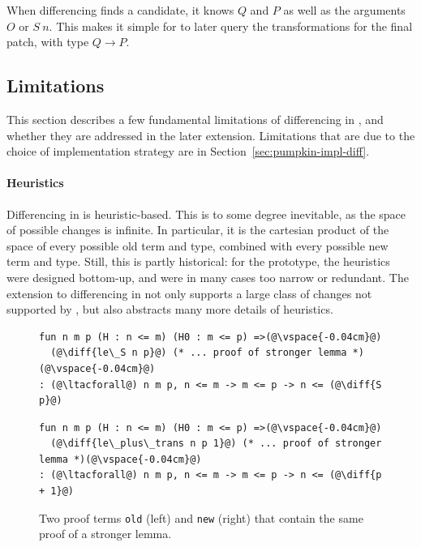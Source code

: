 When differencing finds a candidate, it knows $Q$ and $P$ as well as the arguments $O$ or $S\ n$.
This makes it simple for \sysname to later query the transformations for the final patch, with type $Q \rightarrow P$.

\subsection{Limitations}
\label{sec:pumpkin-diff-limitations}


This section describes a few fundamental limitations of differencing in \sysname,
and whether they are addressed in the later \toolnamec extension.
Limitations that are due to the choice of implementation strategy are in Section~\ref{sec:pumpkin-impl-diff}.

\paragraph{Heuristics}
Differencing in \sysname is heuristic-based.
This is to some degree inevitable, as the space of possible changes is infinite.
In particular, it is the cartesian product of the space of every possible old term and type,
combined with every possible new term and type.
Still, this is partly historical: for the \sysname prototype, the heuristics were designed bottom-up, and were in many cases too narrow or redundant.
The extension to differencing in \toolnamec not only supports a large class of changes not supported by \sysname,
but also abstracts many more details of heuristics.

\begin{figure}[ht]
\begin{minipage}{0.48\textwidth}
\begin{lstlisting}[language=coq]
fun n m p (H : n <= m) (H0 : m <= p) =>(@\vspace{-0.04cm}@)
  (@\diff{le\_S n p}@) (* ... proof of stronger lemma *)(@\vspace{-0.04cm}@)
: (@\ltacforall@) n m p, n <= m -> m <= p -> n <= (@\diff{S p}@)
\end{lstlisting}
\end{minipage}
\hfill
\begin{minipage}{0.48\textwidth}
\begin{lstlisting}[language=coq]
fun n m p (H : n <= m) (H0 : m <= p) =>(@\vspace{-0.04cm}@)
  (@\diff{le\_plus\_trans n p 1}@) (* ... proof of stronger lemma *)(@\vspace{-0.04cm}@)
: (@\ltacforall@) n m p, n <= m -> m <= p -> n <= (@\diff{p + 1}@)
\end{lstlisting}
\end{minipage}
\vspace{-.35cm}
\caption{Two proof terms \lstinline{old} (left) and \lstinline{new} (right) that contain the same proof of a stronger lemma.}
\label{fig:stronger}
\end{figure}

